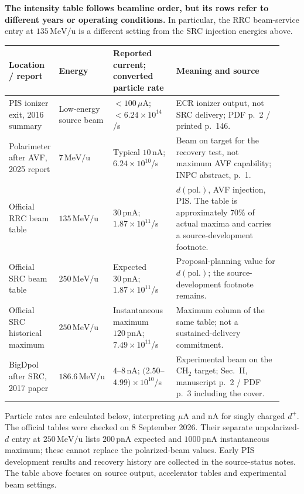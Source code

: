\documentclass[11pt,a4paper]{article}
\begin{document}
\clearpage
\textbf{The intensity table follows beamline order, but its rows refer to different years or operating conditions.} In particular, the RRC beam-service entry at $135\,\mathrm{MeV/u}$ is a different setting from the SRC injection energies above.
\begingroup
\small
\setlength{\tabcolsep}{4pt}
\begin{longtable}{@{}>{\raggedright\arraybackslash}p{0.18\linewidth}>{\raggedright\arraybackslash}p{0.13\linewidth}>{\raggedright\arraybackslash}p{0.23\linewidth}>{\raggedright\arraybackslash}p{0.39\linewidth}@{}}
\toprule
Location / report & Energy & Reported current; converted particle rate & Meaning and source \\
\midrule
\endhead
PIS ionizer exit, 2016 summary & Low-energy source beam & $<100\,\mu\mathrm{A}$; $<6.24\times10^{14}$/s & ECR ionizer output, not SRC delivery; PDF p.~2 / printed p.~146.\cite{sakamoto2016}\\
Polarimeter after AVF, 2025 report & $7\,\mathrm{MeV/u}$ & Typical $10\,\mathrm{nA}$; $6.24\times10^{10}$/s & Beam on target for the recovery test, not maximum AVF capability; INPC abstract, p.~1.\cite{sugahara2025}\\
Official RRC beam table & $135\,\mathrm{MeV/u}$ & $30\,\mathrm{pnA}$; $1.87\times10^{11}$/s & $d(\mathrm{pol.})$, AVF injection, PIS. The table is approximately 70\% of actual maxima and carries a source-development footnote.\cite{accelerator-intensity}\\
Official SRC beam table & $250\,\mathrm{MeV/u}$ & Expected $30\,\mathrm{pnA}$; $1.87\times10^{11}$/s & Proposal-planning value for $d(\mathrm{pol.})$; the source-development footnote remains.\cite{accelerator-intensity}\\
Official SRC historical maximum & $250\,\mathrm{MeV/u}$ & Instantaneous maximum $120\,\mathrm{pnA}$; $7.49\times10^{11}$/s & Maximum column of the same table; not a sustained-delivery commitment.\cite{accelerator-intensity}\\
BigDpol after SRC, 2017 paper & $186.6\,\mathrm{MeV/u}$ & $4$--$8\,\mathrm{nA}$; $(2.50$--$4.99)\times10^{10}$/s & Experimental beam on the CH$_2$ target; Sec.~II, manuscript p.~2 / PDF p.~3 including the cover.\cite{sekiguchi2017}\\
\bottomrule
\end{longtable}
\endgroup

Particle rates are calculated below, interpreting $\mu\mathrm{A}$ and $\mathrm{nA}$ for singly charged $d^+$. The official tables were checked on 8 September 2026. Their separate unpolarized-$d$ entry at $250\,\mathrm{MeV/u}$ lists $200\,\mathrm{pnA}$ expected and $1000\,\mathrm{pnA}$ instantaneous maximum; these cannot replace the polarized-beam values.\cite{accelerator-intensity} Early PIS development results and recovery history are collected in the source-status notes. The table above focuses on source output, accelerator tables and experimental beam settings.
\end{document}
